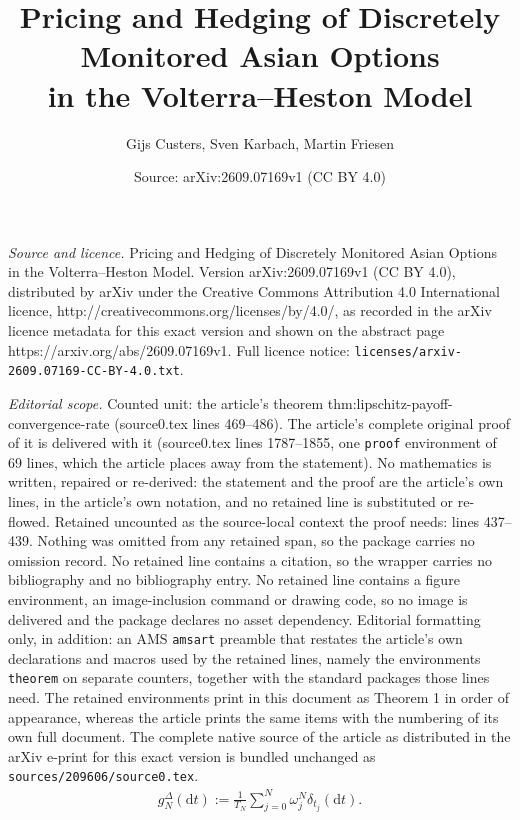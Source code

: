 \documentclass[10pt,a4paper]{amsart}
\title{Pricing and Hedging of Discretely Monitored Asian Options\\in the Volterra--Heston Model}
\author{Gijs Custers, Sven Karbach, Martin Friesen}
\date{Source: arXiv:2609.07169v1 (CC BY 4.0)}
\begin{document}
\maketitle

\noindent\emph{Source and licence.} Pricing and Hedging of Discretely Monitored Asian Options\\in the Volterra--Heston Model. Version arXiv:2609.07169v1 (CC BY 4.0), distributed by arXiv under the Creative Commons Attribution 4.0 International licence, http://creativecommons.org/licenses/by/4.0/, as recorded in the arXiv licence metadata for this exact version and shown on the abstract page https://arxiv.org/abs/2609.07169v1. Full licence notice: \texttt{licenses/arxiv-2609.07169-CC-BY-4.0.txt}.\par\smallskip

\noindent\textit{Editorial scope.} Counted unit: the article's theorem thm:lipschitz-payoff-convergence-rate (source0.tex lines 469--486). The article's complete original proof of it is delivered with it (source0.tex lines 1787--1855, one \texttt{proof} environment of 69 lines, which the article places away from the statement). No mathematics is written, repaired or re-derived: the statement and the proof are the article's own lines, in the article's own notation, and no retained line is substituted or re-flowed.  Retained uncounted as the source-local context the proof needs: lines 437--439.  Nothing was omitted from any retained span, so the package carries no omission record.  No retained line contains a citation, so the wrapper carries no bibliography and no bibliography entry.  No retained line contains a figure environment, an image-inclusion command or drawing code, so no image is delivered and the package declares no asset dependency.  Editorial formatting only, in addition: an AMS \texttt{amsart} preamble that restates the article's own declarations and macros used by the retained lines, namely the environments \texttt{theorem} on separate counters, together with the standard packages those lines need.  The retained environments print in this document as Theorem 1 in order of appearance, whereas the article prints the same items with the numbering of its own full document.  The complete native source of the article as distributed in the arXiv e-print for this exact version is bundled unchanged as \texttt{sources/209606/source0.tex}.
\begin{align}\label{eq:gN-delta-general}
    g_N^\Delta(\mathrm{d}t) := \frac{1}{T_N}\sum_{j=0}^N\omega_j^N\delta_{t_j}(\mathrm{d}t).
\end{align}
\end{document}
